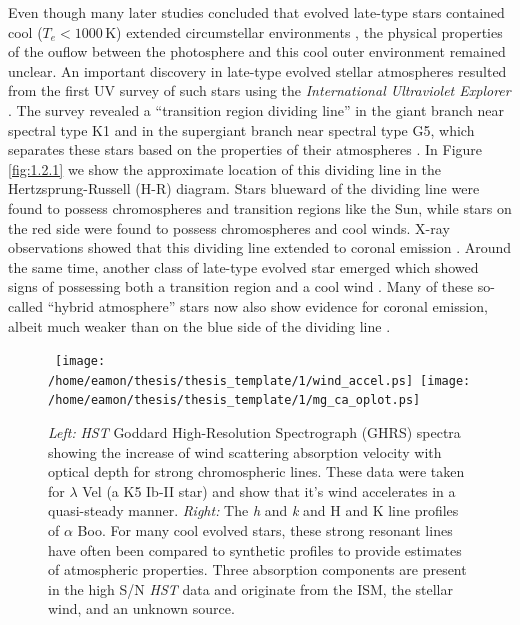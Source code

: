Even though many later studies concluded that evolved late-type stars contained cool ($T_{e} < 1000$\,K) extended  circumstellar environments \citep[e.g.,][]{weymann_1962,gehrz_1971,bernat_1976,reimers_1975}, the physical properties of the ouflow between the photosphere and this cool outer environment remained unclear. An important discovery in late-type evolved stellar atmospheres resulted from the first UV survey of such stars using the \textit{International Ultraviolet Explorer} \citep[\textit{IUE};][]{macchetto_1978}. The survey revealed a ``transition region dividing line'' in the giant branch near spectral type K1 and in the supergiant branch near spectral type G5, which separates these stars based on the properties of their atmospheres \citep{linsky_1979, simon_1982}. In Figure \ref{fig:1.2.1} we show the approximate location of this dividing line in the Hertzsprung-Russell (H-R) diagram. Stars blueward of the dividing line were found to possess chromospheres and transition regions like the Sun, while stars on the red side were found to possess chromospheres and cool winds. X-ray observations showed that this dividing line extended to coronal emission \citep{ayres_1981}. Around the same time, another class of late-type evolved star emerged which showed signs of possessing both a transition region and a cool wind \citep[e.g.,][]{reimers_1982}. Many of these so-called ``hybrid atmosphere'' stars now also show evidence for coronal emission, albeit much weaker than on the blue side of the dividing line \citep[e.g.,][]{ayres_1997}. 

\begin{figure}[ht!]
\centering 
\mbox{
          \texttt{[image: /home/eamon/thesis/thesis\_template/1/wind\_accel.ps]} 
          \texttt{[image: /home/eamon/thesis/thesis\_template/1/mg\_ca\_oplot.ps]}
          }
\caption[\textit{HST }strong chromospheric lines]{\textit{Left:} \textit{HST} Goddard High-Resolution Spectrograph (GHRS) spectra showing the increase of wind scattering absorption velocity with optical depth for strong chromospheric lines. These data were taken for $\lambda$ Vel (a K5 Ib-II star) and show that it's wind accelerates in a quasi-steady manner. \textit{Right:} The  \textit{h} and \textit{k} and  H and K line profiles of $\alpha$ Boo. For many cool evolved stars, these strong resonant lines have often been compared to synthetic profiles to provide estimates of atmospheric properties. Three absorption components are present in the high S/N \textit{HST} data and originate from the ISM, the stellar wind, and an unknown source.}
\label{fig:1.2.2}
\end{figure}

